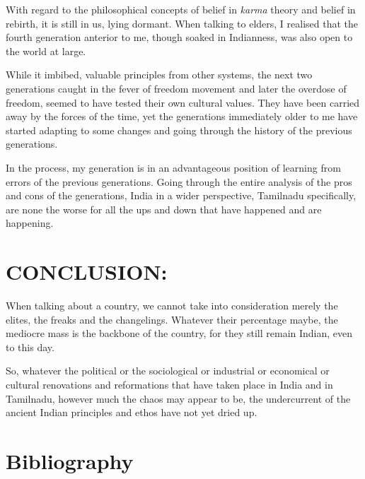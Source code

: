 With regard to the philosophical concepts of belief in \textit{karma} theory and belief in rebirth, it is still in us, lying dormant. When talking to elders, I realised that the fourth generation anterior to me, though soaked in Indianness, was also open to the world at large.

While it imbibed, valuable principles from other systems, the next two generations caught in the fever of freedom movement and later the overdose of freedom, seemed to have tested their own cultural values. They have been carried away by the forces of the time, yet the generations immediately older to me have started adapting to some changes and going through the history of the previous generations.

In the process, my generation is in an advantageous position of learning from errors of the previous generations. Going through the entire analysis of the pros and cons of the generations, India in a wider perspective, Tamilnadu specifically, are none the worse for all the ups and down that have happened and are happening.


\section*{CONCLUSION:}

When talking about a country, we cannot take into consideration merely the elites, the freaks and the changelings. Whatever their percentage maybe, the mediocre mass is the backbone of the country, for they still remain Indian, even to this day.

So, whatever the political or the sociological or industrial or economical or cultural renovations and reformations that have taken place in India and in Tamilnadu, however much the chaos may appear to be, the undercurrent of the ancient Indian principles and ethos have not yet dried up.


\section*{Bibliography}

